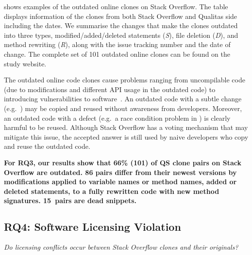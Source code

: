 \documentclass[10pt,journal,compsoc]{IEEEtran}
\begin{document}
 shows examples of the outdated online clones on
Stack Overflow. The table displays information of the clones from both Stack
Overflow and Qualitas side including the dates. We summarise the changes that
make the clones outdated into three types, modified/added/deleted statements
(\textit{S}), file deletion (\textit{D}), and method rewriting (\textit{R}),
along with the issue tracking number and the date of change. The complete set of
101 outdated online clones can be found on the study website.

The outdated online code clones cause problems ranging from uncompilable code
(due to modifications and different API usage in the outdated code) to
introducing vulnerabilities to software~\cite{Xia2014}. An outdated code with a
subtle change (e.g.~) may be copied and reused without
awareness from developers. Moreover, an outdated code with a defect (e.g.~a race
condition problem in ) is clearly harmful to be reused.
Although Stack Overflow has a voting mechanism that may mitigate this issue, the
accepted answer is still used by naive developers who copy and reuse the
outdated code.

\textbf{For RQ3, our results show that 66\% (101) of QS clone pairs on Stack
	Overflow are outdated. 86 pairs differ from their newest versions by
	modifications applied to variable names or method names, added or deleted
	statements, to a fully rewritten code with new method signatures. 15~pairs are
	dead snippets.}

\subsection{RQ4: Software Licensing Violation}
\vspace{0.25cm}
\textit{Do
	licensing conflicts occur between Stack Overflow clones and their
	originals?}
\vspace{0.25cm}
\end{document}
